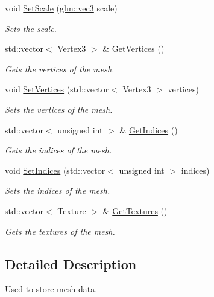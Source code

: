 \begin{CompactItemize}
void \hyperlink{class_mesh_d40c958d695b3aba9855581ed56a8118}{SetScale} (\hyperlink{group__core__types_g1c47e8b3386109bc992b6c48e91b0be7}{glm::vec3} scale)
\begin{CompactList}\small\item\em Sets the scale. \item\end{CompactList}\item 
std::vector$<$ Vertex3 $>$ \& \hyperlink{class_mesh_e6c2ecc1d274027b40cb75dad610eb93}{GetVertices} ()
\begin{CompactList}\small\item\em Gets the vertices of the mesh. \item\end{CompactList}\item 
void \hyperlink{class_mesh_9f9d573f88176edf6a883ee5da35ab06}{SetVertices} (std::vector$<$ Vertex3 $>$ vertices)
\begin{CompactList}\small\item\em Sets the vertices of the mesh. \item\end{CompactList}\item 
std::vector$<$ unsigned int $>$ \& \hyperlink{class_mesh_411f2f5c53f04b607d66b15450a57b9a}{GetIndices} ()
\begin{CompactList}\small\item\em Gets the indices of the mesh. \item\end{CompactList}\item 
void \hyperlink{class_mesh_632245c4ccf578208f0a75e183c68e34}{SetIndices} (std::vector$<$ unsigned int $>$ indices)
\begin{CompactList}\small\item\em Sets the indices of the mesh. \item\end{CompactList}\item 
std::vector$<$ Texture $>$ \& \hyperlink{class_mesh_95ffc7584eff5e065901637728e0f66a}{GetTextures} ()
\begin{CompactList}\small\item\em Gets the textures of the mesh. \item\end{CompactList}\end{CompactItemize}


\subsection{Detailed Description}
Used to store mesh data. 

